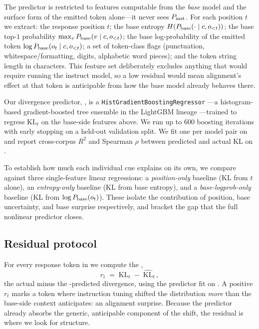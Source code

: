 The predictor is restricted to features computable from the \emph{base} model and the surface form of the emitted token alone---it never sees $P_{\mathrm{inst}}$. For each position $t$ we extract: the response position $t$; the base entropy $H(P_{\mathrm{base}}(\cdot\mid c,o_{<t}))$; the base top-$1$ probability $\max_v P_{\mathrm{base}}(v\mid c,o_{<t})$; the base log-probability of the emitted token $\log P_{\mathrm{base}}(o_t\mid c,o_{<t})$; a set of token-class flags (\eg punctuation, whitespace/formatting, digits, alphabetic word pieces); and the token string length in characters. This feature set deliberately excludes anything that would require running the instruct model, so a low residual would mean alignment's effect at that token is anticipable from how the base model already behaves there.

 Our divergence predictor, \gbt, is a \texttt{HistGradientBoostingRegressor} \citep{pedregosa2011scikit}---a histogram-based gradient-boosted tree ensemble in the LightGBM lineage \citep{ke2017lightgbm}---trained to regress $\mathrm{KL}_t$ on the base-side features above. We run up to $600$ boosting iterations with early stopping on a held-out validation split. We fit one \gbt per model pair on \dolly and report cross-corpus $R^2$ and Spearman $\rho$ between predicted and actual KL on \justeval.

 To establish how much each individual cue explains on its own, we compare \gbt against three single-feature linear regressions: a \emph{position-only} baseline (KL from $t$ alone), an \emph{entropy-only} baseline (KL from base entropy), and a \emph{base-logprob-only} baseline (KL from $\log P_{\mathrm{base}}(o_t)$). These isolate the contribution of position, base uncertainty, and base surprise respectively, and bracket the gap that the full nonlinear predictor closes.

\subsection{Residual protocol}\label{ssec:residual}

 For every response token in \justeval we compute the \resid,
\[
r_t \;=\; \mathrm{KL}_t \;-\; \widehat{\mathrm{KL}}_t\,,
\]
the actual minus the \gbt-predicted divergence, using the predictor fit on \dolly. A positive $r_t$ marks a token where instruction tuning shifted the distribution \emph{more} than the base-side context anticipates: an alignment surprise. Because the predictor already absorbs the generic, anticipable component of the shift, the residual is where we look for structure.

